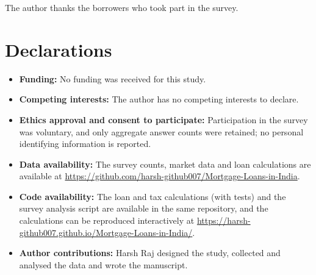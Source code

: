 \documentclass[sn-basic]{sn-jnl}
\begin{document}
\backmatter

The author thanks the borrowers who took part in the survey.

\section*{Declarations}

\begin{itemize}
\item \textbf{Funding:} No funding was received for this study.
\item \textbf{Competing interests:} The author has no competing interests to declare.
\item \textbf{Ethics approval and consent to participate:} Participation in the survey was voluntary, and only aggregate answer counts were retained; no personal identifying information is reported.
\item \textbf{Data availability:} The survey counts, market data and loan calculations are available at \url{https://github.com/harsh-github007/Mortgage-Loans-in-India}.
\item \textbf{Code availability:} The loan and tax calculations (with tests) and the survey analysis script are available in the same repository, and the calculations can be reproduced interactively at \url{https://harsh-github007.github.io/Mortgage-Loans-in-India/}.
\item \textbf{Author contributions:} Harsh Raj designed the study, collected and analysed the data and wrote the manuscript.
\end{itemize}


\end{document}
